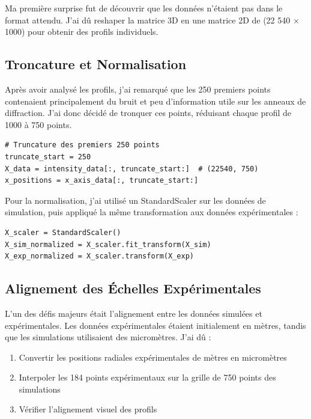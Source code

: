 \documentclass[11pt,a4paper]{article}
\begin{document}
Ma première surprise fut de découvrir que les données n'étaient pas dans le format attendu. J'ai dû reshaper la matrice 3D en une matrice 2D de (22 540 × 1000) pour obtenir des profils individuels.

\subsection{Troncature et Normalisation}

Après avoir analysé les profils, j'ai remarqué que les 250 premiers points contenaient principalement du bruit et peu d'information utile sur les anneaux de diffraction. J'ai donc décidé de tronquer ces points, réduisant chaque profil de 1000 à 750 points.

\begin{lstlisting}[caption=Troncature des profils]
# Truncature des premiers 250 points
truncate_start = 250
X_data = intensity_data[:, truncate_start:]  # (22540, 750)
x_positions = x_axis_data[:, truncate_start:]
\end{lstlisting}

Pour la normalisation, j'ai utilisé un StandardScaler sur les données de simulation, puis appliqué la même transformation aux données expérimentales :

\begin{lstlisting}[caption=Normalisation des données]
X_scaler = StandardScaler()
X_sim_normalized = X_scaler.fit_transform(X_sim)
X_exp_normalized = X_scaler.transform(X_exp)
\end{lstlisting}

\subsection{Alignement des Échelles Expérimentales}

L'un des défis majeurs était l'alignement entre les données simulées et expérimentales. Les données expérimentales étaient initialement en mètres, tandis que les simulations utilisaient des micromètres. J'ai dû :

\begin{enumerate}
    \item Convertir les positions radiales expérimentales de mètres en micromètres
    \item Interpoler les 184 points expérimentaux sur la grille de 750 points des simulations
    \item Vérifier l'alignement visuel des profils
\end{enumerate}
\end{document}

